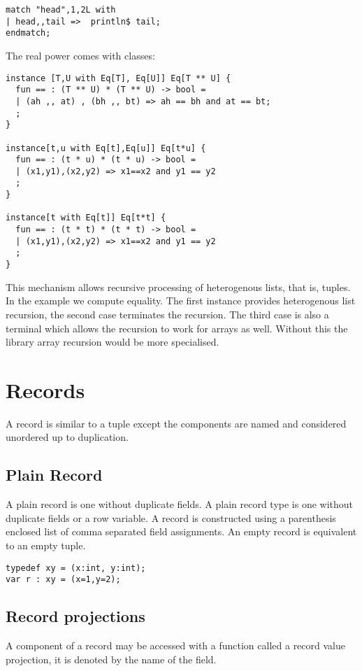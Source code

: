 \documentclass[oneside]{book}
\begin{document}
\begin{verbatim}
match "head",1,2L with
| head,,tail =>  println$ tail;
endmatch;
\end{verbatim}

The real power comes with classes:

\begin{verbatim}
instance [T,U with Eq[T], Eq[U]] Eq[T ** U] {
  fun == : (T ** U) * (T ** U) -> bool =
  | (ah ,, at) , (bh ,, bt) => ah == bh and at == bt;
  ;
}

instance[t,u with Eq[t],Eq[u]] Eq[t*u] {
  fun == : (t * u) * (t * u) -> bool =
  | (x1,y1),(x2,y2) => x1==x2 and y1 == y2
  ;
}

instance[t with Eq[t]] Eq[t*t] {
  fun == : (t * t) * (t * t) -> bool =
  | (x1,y1),(x2,y2) => x1==x2 and y1 == y2
  ;
}
\end{verbatim}

This mechanism allows recursive processing of heterogenous lists,
that is, tuples. In the example we compute equality.
The first instance provides heterogenous list recursion, 
the second case terminates the recursion. The third case
is also a terminal which allows the recursion to work
for arrays as well. Without this the library array recursion
would be more specialised.


\section{Records}
A record is similar to a tuple except the components are 
named and considered unordered up to duplication.

\subsection{Plain Record}
A plain record is one without duplicate fields. A plain record
type is one without duplicate fields or a row variable.
A record is constructed using a parenthesis enclosed list
of comma separated field assignments. An empty record is
equivalent to an empty tuple.

\begin{verbatim}
typedef xy = (x:int, y:int);
var r : xy = (x=1,y=2);
\end{verbatim}

\subsection{Record projections}
A component of a record may be accessed with a 
function called a record value projection, it is denoted
by the name of the field.
\end{document}
